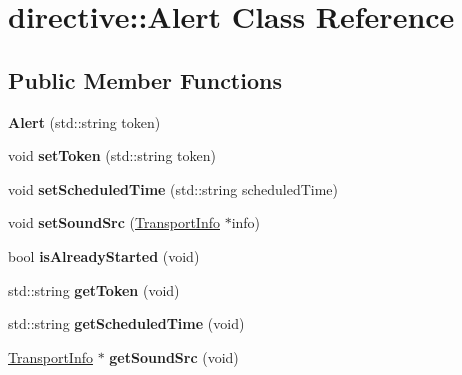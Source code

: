 \hypertarget{classdirective_1_1Alert}{}\section{directive\+:\+:Alert Class Reference}
\label{classdirective_1_1Alert}
\subsection*{Public Member Functions}
\begin{DoxyCompactItemize}
\item 
\mbox{\label{classdirective_1_1Alert_a198746c0ed83794ac3306e71870cd1e9}} 
{\bfseries Alert} (std\+::string token)
\item 
\mbox{\label{classdirective_1_1Alert_a1789a624690a3c9c92d4d643af29f4ea}} 
void {\bfseries set\+Token} (std\+::string token)
\item 
\mbox{\label{classdirective_1_1Alert_a7c2c5ef481c025fd106f9f8ebc4e3673}} 
void {\bfseries set\+Scheduled\+Time} (std\+::string scheduled\+Time)
\item 
\mbox{\label{classdirective_1_1Alert_a09df7d7be964999fcfbb970c8d57daa5}} 
void {\bfseries set\+Sound\+Src} (\hyperlink{classAlexaEvent_1_1TransportInfo}{Transport\+Info} $\ast$info)
\item 
\mbox{\label{classdirective_1_1Alert_a335ab9859cf6fae6ed2fa591d17ff68d}} 
bool {\bfseries is\+Already\+Started} (void)
\item 
\mbox{\label{classdirective_1_1Alert_a342ecf5fbc188ab3f5d139c3b1e5d6a9}} 
std\+::string {\bfseries get\+Token} (void)
\item 
\mbox{\label{classdirective_1_1Alert_a77800085eee5934f21993f7addf2e5dc}} 
std\+::string {\bfseries get\+Scheduled\+Time} (void)
\item 
\mbox{\label{classdirective_1_1Alert_abffa2ec80c6c934ef6abb0b911b32df8}} 
\hyperlink{classAlexaEvent_1_1TransportInfo}{Transport\+Info} $\ast$ {\bfseries get\+Sound\+Src} (void)

\end{DoxyCompactItemize}

